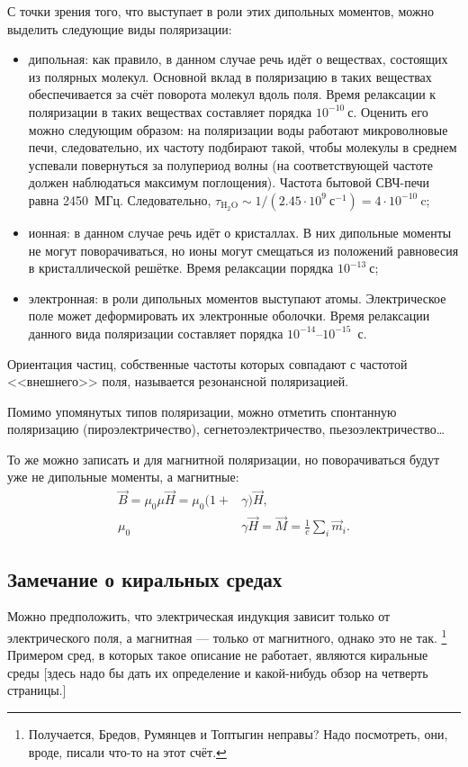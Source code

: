 С точки зрения того, что выступает в роли этих дипольных моментов, 
можно выделить следующие виды поляризации:
\begin{itemize}
	\item дипольная: как правило, в данном случае речь идёт о веществах, состоящих из полярных молекул.
	Основной вклад в поляризацию в таких веществах обеспечивается за счёт поворота молекул вдоль поля.
	Время релаксации к поляризации в таких веществах составляет порядка \(10^{-10}~\text{с}\). Оценить его
	можно следующим образом: на поляризации воды работают микроволновые печи, следовательно, их частоту
	подбирают такой, чтобы молекулы в среднем успевали повернуться за полупериод волны (на соответствующей
	частоте должен наблюдаться максимум поглощения). Частота бытовой СВЧ-печи равна 2450~МГц. Следовательно, 
	\(\tau_{\text{H}_2\text{O}} \sim 1 / (2.45\cdot10^{9}~\text{с}^{-1}) = 4\cdot10^{-10}~\text{c}\);
	\item ионная: в данном случае речь идёт о кристаллах. В них дипольные моменты не могут поворачиваться,
	но ионы могут смещаться из положений равновесия в кристаллической решётке. Время релаксации порядка
	\(10^{-13}~\text{с}\);
	\item электронная: в роли дипольных моментов выступают атомы. Электрическое
	поле может деформировать их электронные оболочки. Время релаксации данного вида
	поляризации составляет порядка \(10^{-14}\)--\(10^{-15}\)~с.
\end{itemize}
Ориентация частиц, собственные частоты которых совпадают с частотой <<внешнего>> поля, называется резонансной поляризацией.

Помимо упомянутых типов поляризации, можно отметить спонтанную поляризацию (пироэлектричество),
сегнетоэлектричество, пьезоэлектричество\ldots

То же можно записать и для магнитной поляризации, но поворачиваться будут уже не дипольные моменты,
а магнитные:
\begin{align*}
	\vec{B} = \mu_0\mu\vec{H} = \mu_0(1 + &\gamma)\vec{H}, \\
	\mu_0&\gamma\vec{H} = \vec{M} = \frac{1}{c}\sum_i \vec{m}_i.
\end{align*}

\subsection{Замечание о киральных средах}
Можно предположить, что электрическая индукция зависит только от электрического поля,
а магнитная --- только от магнитного, однако это не так.%
\footnote{Получается, Бредов, Румянцев и Топтыгин неправы? Надо посмотреть, они, вроде, писали что-то на этот счёт.}
Примером сред, в которых такое описание не работает, являются киральные среды [здесь надо бы дать их определение и какой-нибудь обзор на четверть страницы.]

